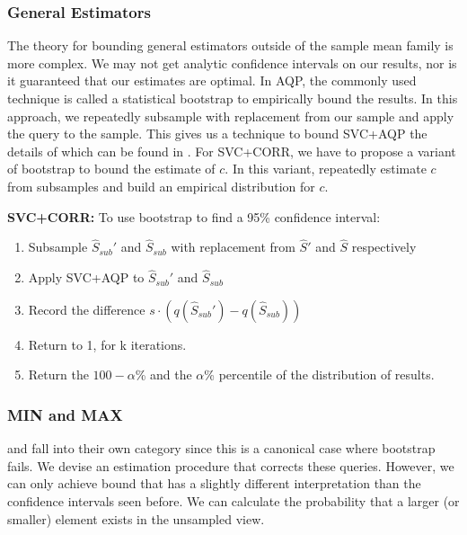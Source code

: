 \subsubsection{General Estimators}
The theory for bounding general estimators outside of the sample mean family is more complex.
We may not get analytic confidence intervals on our results, nor is it guaranteed that our estimates are optimal.
In AQP, the commonly used technique is called a statistical bootstrap \cite{AgarwalMPMMS13} to empirically bound the results.
In this approach, we repeatedly subsample with replacement from our sample and apply the query to the sample.
This gives us a technique to bound SVC+AQP the details of which can be found in \cite{AgarwalMPMMS13, agarwalknowing, DBLP:conf/sigmod/ZengGMZ14}. 
For SVC+CORR, we have to propose a variant of bootstrap to bound the estimate of $c$.
In this variant, repeatedly estimate $c$ from subsamples and build an empirical distribution for $c$.

\vspace{0.35em}

\noindent\textbf{SVC+CORR: } To use bootstrap to find a 95\% confidence interval:
\begin{enumerate}[noitemsep]
\item Subsample $\widehat{S}_{sub}'$ and $\widehat{S}_{sub}$ with replacement from $\widehat{S}'$ and $\widehat{S}$ respectively
\item Apply SVC+AQP to $\widehat{S}_{sub}'$ and $\widehat{S}_{sub}$
\item Record the difference $s\cdot(q(\widehat{S}_{sub}')-q(\widehat{S}_{sub}))$
\item Return to 1, for k iterations.
\item Return the $100-\alpha$\% and the $\alpha$\% percentile of the distribution of results.
\end{enumerate}

\iffalse
\subsubsection{MIN and MAX}
\minfunc and \maxfunc fall into their own category since this is a canonical case where bootstrap fails.
We devise an estimation procedure that corrects these queries.
However, we can only achieve bound that has a slightly different interpretation than the confidence intervals seen before.
We can calculate the probability that a larger (or smaller) element exists in the unsampled view.

